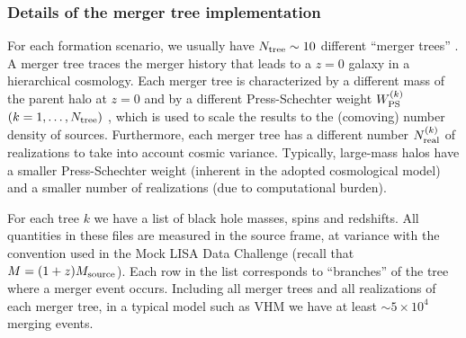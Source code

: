 \documentclass{iopart}
\begin{document}

\subsubsection{Details of the merger tree implementation}

For each formation scenario, we usually have $N_{\rm tree}\sim 10$ different
``merger trees'' \cite{Lacey:1993iv}. A merger tree traces the merger history
that leads to a $z=0$ galaxy in a hierarchical cosmology. Each merger tree is
characterized by a different mass of the parent halo at $z=0$ and by a
different Press-Schechter weight $W_{\rm PS}^{(k)}$ $(k=1,\dots,N_{\rm tree})$
\cite{Press:1973iz,Sheth:2001dp}, which is used to scale the results to the
(comoving) number density of sources. Furthermore, each merger tree has a
different number $N_{\rm real}^{(k)}$ of realizations to take into account
cosmic variance.  Typically, large-mass halos have a smaller Press-Schechter
weight (inherent in the adopted cosmological model) and a smaller number of
realizations (due to computational burden).

For each tree $k$ we have a list of black hole masses, spins and
redshifts. All quantities in these files are measured in the source frame, at
variance with the convention used in the Mock LISA Data Challenge (recall that
$M=(1+z)M_{\rm source}$). Each row in the list corresponds to ``branches'' of
the tree where a merger event occurs. Including all merger trees and all
realizations of each merger tree, in a typical model such as VHM we have at
least $\sim 5\times 10^4$ merging events. 
\end{document}

